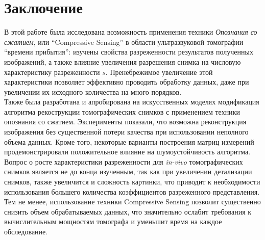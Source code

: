 \documentclass[14pt]{matmex-diploma}
\begin{document}
\section{Заключение} \label{sec:concluding}
В этой работе была исследована возможность применения техники \textit{Опознания со сжатием}, или ``Compressive Sensing'' в области ультразвуковой томографии ``времени прибытия'': изучены свойства разреженности результатов полученных изображений, а также влияние увеличения разрешения снимка на числовую характеристику разреженности $s$. Пренебрежимое увеличение этой характеристики позволяет эффективно проводить обработку данных, даже при увеличении их исходного количества на много порядков. \\
Также была разработана и апробирована на искусственных моделях модификация алгоритма рекострукции томографических снимков с применением техники опознания со сжатием. Эксперименты показали, что возможна реконструкция изображения без существенной потери качества при использовании неполного объема данных. Кроме того, некоторые варианты построения матриц измерений продемонстрировали положительное влияние на шумоустойчивость алгоритма.
Вопрос о росте характеристики разреженности для \textit{in-vivo} томографических снимков является не до конца изученным, так как при увеличении детализации снимков, также увеличится и сложность картинки, что приводит к необходимости использования большего количества коэффициентов разреженного представления. Тем не менее, использование техники Compressive Sensing позволит существенно снизить объем обрабатываемых данных, что значительно ослабит требования к вычислительным мощностям томографа и уменьшит время на каждое обследование. 






\setmonofont[Mapping=tex-text]{CMU Typewriter Text}


\end{document}
